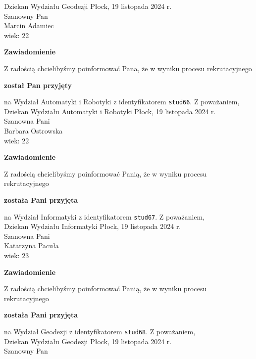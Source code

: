 \documentclass[12pt,a4paper]{article}
\begin{document}
Dziekan
Wydziału Geodezji
\newpage
\hfill Płock, 19 listopada 2024 r. \\
\noindent
Szanowny Pan \\
Marcin Adamiec \\
wiek: 22
\bigskip
\begin{center}
    {\Large\textbf{Zawiadomienie}}
\end{center}
\bigskip 
Z radością chcielibyśmy poinformować Pana, że w wyniku procesu rekrutacyjnego
\begin{center}
\textsf{\textbf{został Pan przyjęty}}
\end{center}
na Wydział Automatyki i Robotyki z identyfikatorem \verb|stud66|. 
\vspace{2cm}
\noindent
Z poważaniem, \\
Dziekan
Wydziału Automatyki i Robotyki
\newpage
\hfill Płock, 19 listopada 2024 r. \\
\noindent
Szanowna Pani \\
Barbara Ostrowska \\
wiek: 22
\bigskip
\begin{center}
    {\Large\textbf{Zawiadomienie}}
\end{center}
\bigskip 
Z radością chcielibyśmy poinformować Panią, że w wyniku procesu rekrutacyjnego
\begin{center}
\textsf{\textbf{została Pani przyjęta}}
\end{center}
na Wydział Informatyki z identyfikatorem \verb|stud67|. 
\vspace{2cm}
\noindent
Z poważaniem, \\
Dziekan
Wydziału Informatyki
\newpage
\hfill Płock, 19 listopada 2024 r. \\
\noindent
Szanowna Pani \\
Katarzyna Pacuła \\
wiek: 23
\bigskip
\begin{center}
    {\Large\textbf{Zawiadomienie}}
\end{center}
\bigskip 
Z radością chcielibyśmy poinformować Panią, że w wyniku procesu rekrutacyjnego
\begin{center}
\textsf{\textbf{została Pani przyjęta}}
\end{center}
na Wydział Geodezji z identyfikatorem \verb|stud68|. 
\vspace{2cm}
\noindent
Z poważaniem, \\
Dziekan
Wydziału Geodezji
\newpage
\hfill Płock, 19 listopada 2024 r. \\
\noindent
Szanowny Pan \\
\end{document}
